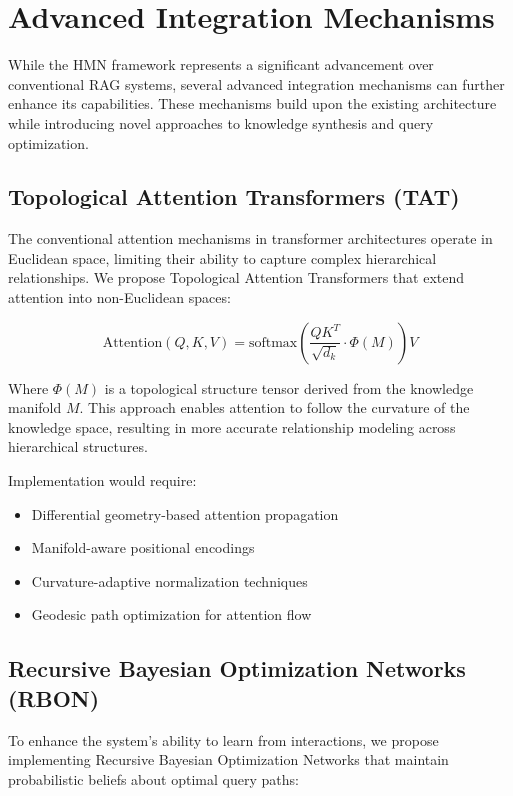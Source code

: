 \documentclass[journal,onecolumn]{IEEEtran}
\begin{document}
\section{Advanced Integration Mechanisms}

While the HMN framework represents a significant advancement over conventional RAG systems, several advanced integration mechanisms can further enhance its capabilities. These mechanisms build upon the existing architecture while introducing novel approaches to knowledge synthesis and query optimization.

\subsection{Topological Attention Transformers (TAT)}

The conventional attention mechanisms in transformer architectures operate in Euclidean space, limiting their ability to capture complex hierarchical relationships. We propose Topological Attention Transformers that extend attention into non-Euclidean spaces:

\begin{equation}
\text{Attention}(Q, K, V) = \text{softmax}\left(\frac{QK^T}{\sqrt{d_k}} \cdot \Phi(M)\right)V
\end{equation}

Where $\Phi(M)$ is a topological structure tensor derived from the knowledge manifold $M$. This approach enables attention to follow the curvature of the knowledge space, resulting in more accurate relationship modeling across hierarchical structures.

Implementation would require:

\begin{itemize}
\item Differential geometry-based attention propagation
\item Manifold-aware positional encodings
\item Curvature-adaptive normalization techniques
\item Geodesic path optimization for attention flow
\end{itemize}

\subsection{Recursive Bayesian Optimization Networks (RBON)}

To enhance the system's ability to learn from interactions, we propose implementing Recursive Bayesian Optimization Networks that maintain probabilistic beliefs about optimal query paths:
\end{document}

